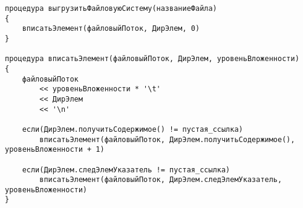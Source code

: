 \begin{verbatim}
процедура выгрузитьФайловуюСистему(названиеФайла)
{
    вписатьЭлемент(файловыйПоток, ДирЭлем, 0)
}

процедура вписатьЭлемент(файловыйПоток, ДирЭлем, уровеньВложенности)
{
    файловыйПоток
        << уровеньВложенности * '\t'
        << ДирЭлем
        << '\n'
    
    если(ДирЭлем.получитьСодержимое() != пустая_ссылка)
        вписатьЭлемент(файловыйПоток, ДирЭлем.получитьСодержимое(), уровеньВложенности + 1)
    
    если(ДирЭлем.следЭлемУказатель != пустая_ссылка)
        вписатьЭлемент(файловыйПоток, ДирЭлем.следЭлемУказатель, уровеньВложенности)
}

\end{verbatim}